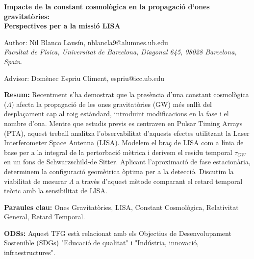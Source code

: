 \documentclass[twocolumn]{revtex4-2}
\begin{document}
\vspace{1cm}


\begin{center}
    {\Large \textbf{Impacte de la constant cosmològica en la propagació d'ones gravitatòries:\\ Perspectives per a la missió LISA}}
    
    \vspace{0.5cm}
    
    Author:   Nil Blanco Lausín, nblancla9@alumnes.ub.edu \\
    \textit{Facultat de Física, Universitat de Barcelona, Diagonal 645, 08028 Barcelona, Spain.}
    
    \vspace{0.2cm}
    Advisor: Domènec Espriu Climent, espriu@icc.ub.edu
\end{center}

\vspace{0.5cm}

\noindent \textbf{Resum:} Recentment s'ha demostrat que la presència d'una constant cosmològica ($\Lambda$) afecta la propagació de les ones gravitatòries (GW) més enllà del desplaçament cap al roig estàndard, introduint modificacions en la fase i el nombre d'ona. Mentre que estudis previs es centraven en Pulsar Timing Arrays (PTA), aquest treball analitza l'observabilitat d'aquests efectes utilitzant la Laser Interferometer Space Antenna (LISA). Modelem el braç de LISA com a línia de base per a la integral de la pertorbació mètrica i derivem el residu temporal $\tau_{GW}$ en un fons de Schwarzschild-de Sitter. Aplicant l'aproximació de fase estacionària, determinem la configuració geomètrica òptima per a la detecció. Discutim la viabilitat de mesurar $\Lambda$ a través d'aquest mètode comparant el retard temporal teòric amb la sensibilitat de LISA.

\vspace{0.3cm}

\noindent \textbf{Paraules clau:} Ones Gravitatòries, LISA, Constant Cosmològica, Relativitat General, Retard Temporal.

\vspace{0.3cm}

\noindent \textbf{ODSs:} Aquest TFG està relacionat amb els Objectius de Desenvolupament Sostenible (SDGs) "Educació de qualitat" i "Indústria, innovació, infraestructures".

\vspace{0.3cm}
\end{document}
